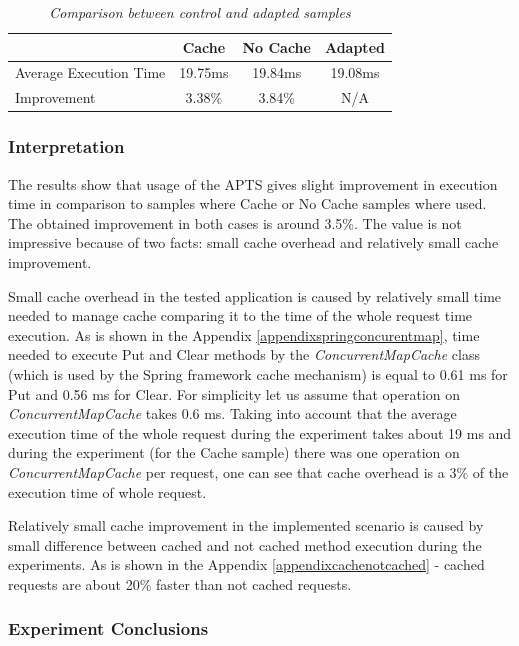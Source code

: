 \documentclass[12pt,a4paper]{article}
\begin{document}
\begin{table}[!htb]
\begin{center}
\begin{tabular}{l|c|c|c}
 & \textbf{Cache} & \textbf{No Cache} & \textbf{Adapted} \\ \hline
Average Execution Time &  19.75ms & 19.84ms & 19.08ms\\ \hline
Improvement &  3.38\% & 3.84\% & N/A\\ 
\end{tabular}
\end{center}
\caption{\textit{Comparison between control and adapted samples}} \label{cacheCompResutls}
\end{table}

\subsubsection{Interpretation} 

The results show that usage of the APTS gives slight improvement in execution time in comparison to samples where Cache or No Cache samples where used. The obtained improvement in both cases is around 3.5\%. The value is not impressive because of two facts: small cache overhead and relatively small cache improvement. 

Small cache overhead in the tested application is caused by relatively small time needed to manage cache comparing it to the time of the whole request time execution. As is shown in the Appendix \ref{appendixspringconcurentmap}, time needed to execute Put and Clear methods by the \textit{ConcurrentMapCache} class (which is used by the Spring framework cache mechanism) is equal to 0.61 ms for Put and 0.56 ms for Clear. For simplicity let us assume that operation on \textit{ConcurrentMapCache} takes 0.6 ms. Taking into account that the average execution time of the whole request during the experiment takes about 19 ms and during the experiment (for the Cache sample) there was one operation on \textit{ConcurrentMapCache} per request, one can see that cache overhead is a 3\% of the execution time of whole request.  

Relatively small cache improvement in the implemented scenario is caused by small difference between cached and not cached method execution during the experiments. As is shown in the Appendix \ref{appendixcachenotcached} - cached requests are about 20\% faster than not cached requests. 

\subsubsection{Experiment Conclusions} 
\end{document}
